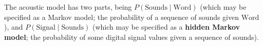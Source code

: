 The acoustic model has two parts, being $P(\text{Sounds} \mid \text{Word})$ (which may be specified as a Markov model; the probability of a sequence of sounds given $\text{Word}$), and $P(\text{Signal} \mid \text{Sounds})$ (which may be specified as a \textbf{hidden Markov model}; the probability of some digital signal values given a sequence of sounds).




\newpage